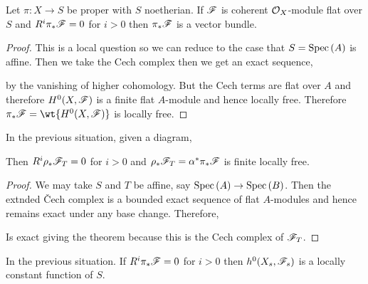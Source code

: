 \documentclass[12pt]{article}
\begin{document}
\begin{prop}
Let $\pi : X \to S$ be proper with $S$ noetherian. If $\mathscr{F}$ is coherent $\mathcal{O}_{X}$-module flat over $S$ and $R^i \pi_* \mathscr{F} = 0$ for $i > 0$ then $\pi_* \mathscr{F}$ is a vector bundle. 
\end{prop}

\begin{proof}
This is a local question so we can reduce to the case that $S = \mathrm{Spec}\left( A \right)$ is affine. Then we take the Cech complex then we get an exact sequence,
\begin{center}
\end{center}
by the vanishing of higher cohomology. But the Cech terms are flat over $A$ and therefore $H^0(X, \mathscr{F})$ is a finite flat $A$-module and hence locally free. Therefore $\pi_* \F = \wt{H^0(X, \F)}$ is locally free. 
\end{proof}

\begin{cor}
In the previous situation, given a diagram,
\begin{center}
\end{center}
Then $R^i \rho_* \mathscr{F}_T = 0$ for $i > 0$ and $\rho_* \mathscr{F}_T = \alpha^* \pi_* \mathscr{F}$ is finite locally free.
\end{cor}

\begin{proof}
We may take $S$ and $T$ be affine, say $\mathrm{Spec}\left( A \right) \to \mathrm{Spec}\left( B \right)$. Then the extnded \v{C}ech complex is a bounded exact sequence of flat $A$-modules and hence remains exact under any base change. Therefore, 
\begin{center}
\end{center}
Is exact giving the theorem because this is the Cech complex of $\mathscr{F}_T$.
\end{proof}

\begin{cor}
In the previous situation. If $R^i \pi_* \mathscr{F} = 0$ for $i > 0$ then $h^0(X_s, \mathscr{F}_s)$ is a locally constant function of $S$.
\end{cor}
\end{document}
